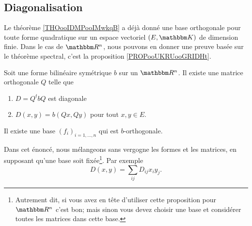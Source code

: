   \subsection{Diagonalisation}
  
Le théorème \ref{THOooIDMPooIMwkqB} a déjà donné une base orthogonale pour toute forme quadratique sur un espace vectoriel \( (E,\eK)\) de dimension finie. Dans le cas de \( \eR^n\), nous pouvons en donner une preuve basée sur le théorème spectral, c'est la proposition \ref{PROPooUKRUooGRIDHt}.

\begin{proposition}     \label{PROPooUKRUooGRIDHt}
    Soit une forme bilinéaire symétrique \( b\) sur un \( \eR^n\). Il existe une matrice orthogonale \( Q\) telle que 
      \begin{enumerate}
          \item
              \( D=Q^tbQ\) est diagonale
          \item
              \( D(x,y)=b(Qx,Qy)\) pour tout \( x,y\in E\).
      \end{enumerate}
    Il existe une base \( (f_i)_{i=1,\ldots, n}\) qui est \( b\)-orthogonale.
\end{proposition}

      Dans cet énoncé, nous mélangeons sans vergogne les formes et les matrices, en supposant qu'une base soit fixée\footnote{Autrement dit, si vous avez en tête d'utiliser cette proposition pour \( \eR^n\) c'est bon; mais sinon vous devez choisir une base et considérer toutes les matrices dans cette base.}. Par exemple
    \begin{equation}
        D(x,y)=\sum_{ij}D_{ij}x_iy_j.
    \end{equation}


